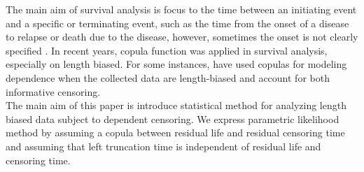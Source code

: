 \documentclass[twoside]{article}
\begin{document}
The main aim of survival analysis is focus to the time between an initiating event and a specific or terminating event, such as the time from the onset of a
disease to relapse or death due to the disease, however, sometimes the onset is not clearly
specified \cite{akbari2025pseudo}. In recent years, copula function was applied in survival analysis, especially on length
biased. For some instances,  \cite{rabhi2020nonparametric} have used copulas for
modeling dependence when the collected data are length-biased and account for both
informative censoring.\\
The main aim of this paper is introduce statistical method for analyzing length biased data subject to dependent censoring. We express parametric likelihood method by
assuming a copula between residual life and residual censoring time and assuming that  left truncation time is independent of residual life and censoring time. 
\end{document}
